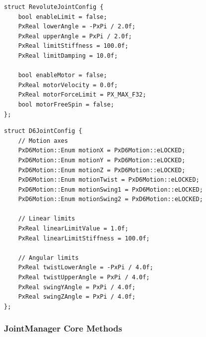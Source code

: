 \begin{lstlisting}[caption={Revolute joint config}]
struct RevoluteJointConfig {
    bool enableLimit = false;
    PxReal lowerAngle = -PxPi / 2.0f;
    PxReal upperAngle = PxPi / 2.0f;
    PxReal limitStiffness = 100.0f;
    PxReal limitDamping = 10.0f;

    bool enableMotor = false;
    PxReal motorVelocity = 0.0f;
    PxReal motorForceLimit = PX_MAX_F32;
    bool motorFreeSpin = false;
};
\end{lstlisting}

\begin{lstlisting}[caption={D6 joint config}]
struct D6JointConfig {
    // Motion axes
    PxD6Motion::Enum motionX = PxD6Motion::eLOCKED;
    PxD6Motion::Enum motionY = PxD6Motion::eLOCKED;
    PxD6Motion::Enum motionZ = PxD6Motion::eLOCKED;
    PxD6Motion::Enum motionTwist = PxD6Motion::eLOCKED;
    PxD6Motion::Enum motionSwing1 = PxD6Motion::eLOCKED;
    PxD6Motion::Enum motionSwing2 = PxD6Motion::eLOCKED;

    // Linear limits
    PxReal linearLimitValue = 1.0f;
    PxReal linearLimitStiffness = 100.0f;

    // Angular limits
    PxReal twistLowerAngle = -PxPi / 4.0f;
    PxReal twistUpperAngle = PxPi / 4.0f;
    PxReal swingYAngle = PxPi / 4.0f;
    PxReal swingZAngle = PxPi / 4.0f;
};
\end{lstlisting}

\subsubsection{JointManager Core Methods}

